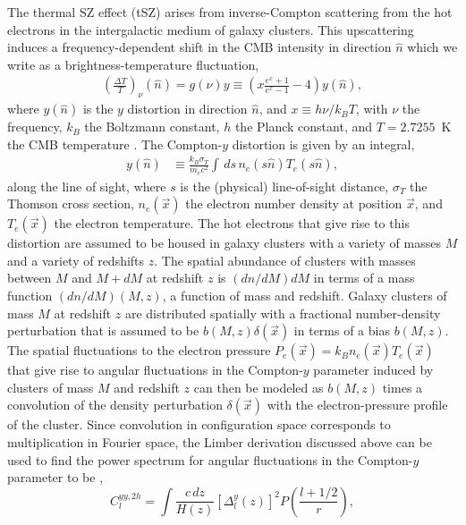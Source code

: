 \documentclass[aps,twocolumn,floats,prd,nofootinbib,10pt,floatfix]{revtex4-1}
\begin{document}
The thermal SZ effect (tSZ) arises from inverse-Compton
scattering from the hot electrons in the intergalactic medium of
galaxy clusters. This upscattering induces a frequency-dependent
shift in the CMB intensity in direction $\hat n$ which we write
as a brightness-temperature fluctuation,
\begin{align}
     \left(\frac{\Delta T}{T}\right)_\nu(\hat{n}) = g(\nu) y \equiv
     \left(x\frac{e^x + 1}{e^x - 1} - 4\right)y(\hat{n}),
\end{align}
where $y(\hat n)$ is the $y$ distortion in direction $\hat n$,
and $x \equiv h\nu/k_B T$, with $\nu$ the frequency, $k_B$ the
Boltzmann constant, $h$ the Planck constant, and $T=2.7255$~K the
CMB temperature \citep{Fixsen:2009}.  The Compton-$y$ distortion is given by an integral,
\begin{align}
     y(\hat{n}) &\equiv \frac{k_B\sigma_T}{m_e
     c^2}\int\,  ds \, n_e(s \hat n) T_e
     (s \hat n),
\label{eqn:yparameter}
\end{align}
along the line of sight, where $s$ is the (physical) line-of-sight
distance, $\sigma_T$ the Thomson cross section, $n_e(\vec x)$ the
electron number density at position $\vec x$, and $T_e(\vec x)$
the electron temperature.  The hot electrons that give rise to
this distortion are assumed to be housed in galaxy clusters
with a variety of masses $M$ and a variety of redshifts $z$.
The spatial abundance of clusters with masses between $M$ and
$M+dM$ at redshift $z$ is $(dn/dM)dM$ in terms of a mass
function $(dn/dM)(M,z)$, a function of mass and redshift.
Galaxy clusters of mass $M$ at redshift $z$ are distributed
spatially with a fractional number-density perturbation that is
assumed to be $b(M,z)\delta(\vec x)$ in terms of a bias
$b(M,z)$.  The spatial fluctuations to the electron pressure
$P_e(\vec x)=k_B n_e(\vec x) T_e(\vec x)$ that give rise to
angular fluctuations in the Compton-$y$ parameter induced by
clusters of mass $M$ and redshift $z$ can then be
modeled as $b(M,z)$ times a convolution of the density
perturbation $\delta(\vec x)$ with the electron-pressure profile
of the cluster.  Since convolution in configuration space
corresponds to multiplication in Fourier space, the Limber
derivation discussed above can be used to find the power
spectrum for angular fluctuations in the Compton-$y$ parameter
to be
\cite{Komatsu:1999ev,Diego:2004uw,Taburet:2010hb,Ade:2013qta,Ade:2015mva},
\begin{equation}
     C_l^{yy,2h} = \int \frac{c\, dz}{H(z)} \left[
     \Delta^{y}_l(z) \right]^2
     P\left(\frac{l+1/2}{r}\right),
\label{eqn:Cly2h}
\end{equation}
\end{document}
